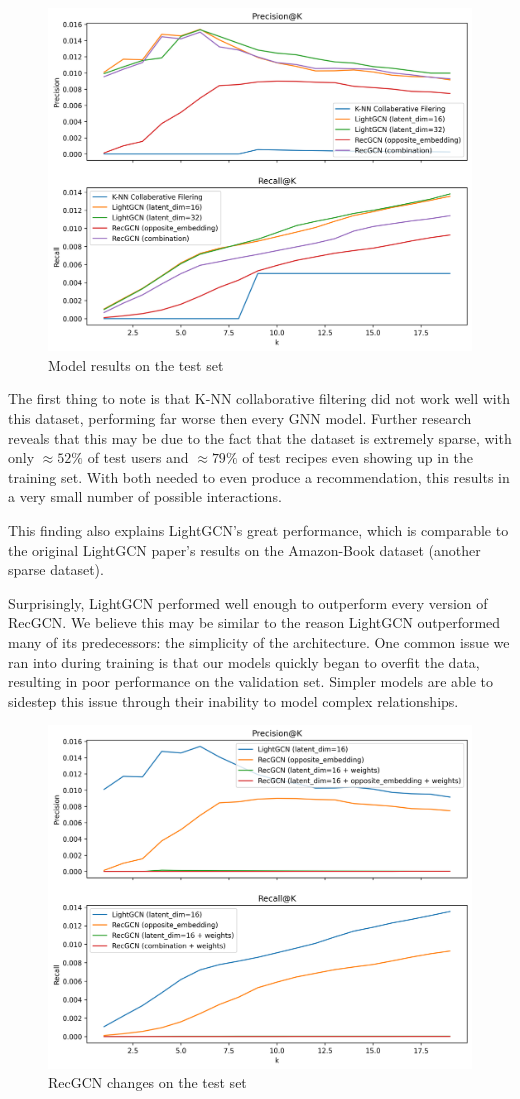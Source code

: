 \documentclass{article}
\begin{document}
\begin{figure}[h]
  \centering
  \includegraphics[width=0.75\linewidth]{figures/model_eval.png}
  \caption{Model results on the test set}
  \label{fig:model_eval}
\end{figure}

The first thing to note is that K-NN collaborative filtering did not work well with this dataset, performing far worse then every GNN model. Further research reveals that this may be due to the fact that the dataset is extremely sparse, with only $\approx 52\%$ of test users and $\approx 79\%$ of test recipes even showing up in the training set. With both needed to even produce a recommendation, this results in a very small number of possible interactions.

This finding also explains LightGCN's great performance, which is comparable to the original LightGCN paper's results on the Amazon-Book dataset (another sparse dataset).

Surprisingly, LightGCN performed well enough to outperform every version of RecGCN. We believe this may be similar to the reason LightGCN outperformed many of its predecessors: the simplicity of the architecture. One common issue we ran into during training is that our models quickly began to overfit the data, resulting in poor performance on the validation set. Simpler models are able to sidestep this issue through their inability to model complex relationships.

\begin{figure}[h]
  \centering
  \includegraphics[width=0.75\linewidth]{figures/flag_eval.png}
  \caption{RecGCN changes on the test set}
  \label{fig:flag_eval}
\end{figure}
\end{document}
